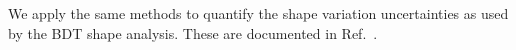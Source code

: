 We apply the same methods to quantify the shape variation uncertainties
as used by the BDT shape analysis.  These are documented in Ref.~\cite{MVASyst}.
